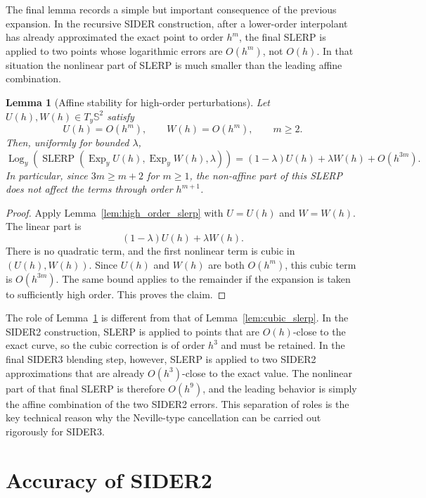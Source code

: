 \documentclass[a4paper,11pt]{article}
\newcommand{\bS}{\mathbb{S}}
\newcommand{\Log}{\operatorname{Log}}
\newcommand{\Exp}{\operatorname{Exp}}
\newcommand{\SLERP}{\operatorname{SLERP}}
\newtheorem{lemma}{Lemma}
\numberwithin{equation}{section}
\begin{document}
The final lemma records a simple but important consequence of the previous
expansion.  In the recursive SIDER construction, after a lower-order
interpolant has already approximated the exact point to order \(h^m\), the
final SLERP is applied to two points whose logarithmic errors are
\(O(h^m)\), not \(O(h)\).  In that situation the nonlinear part of SLERP is
much smaller than the leading affine combination.

\begin{lemma}[Affine stability for high-order perturbations]
\label{lem:affine_stability}
Let \(U(h),W(h)\in T_y\bS^2\) satisfy
\[
        U(h)=O(h^m),\qquad W(h)=O(h^m),
        \qquad m\geq2.
\]
Then, uniformly for bounded \(\lambda\),
\[
\Log_y\!\left(
\SLERP(\Exp_y U(h),\Exp_y W(h),\lambda)
\right)
=
(1-\lambda)U(h)+\lambda W(h)+O(h^{3m}).
\]
In particular, since \(3m\geq m+2\) for \(m\geq1\), the non-affine part of
this SLERP does not affect the terms through order \(h^{m+1}\).
\end{lemma}

\begin{proof}
Apply Lemma~\ref{lem:high_order_slerp} with \(U=U(h)\) and \(W=W(h)\).  The
linear part is
\[
        (1-\lambda)U(h)+\lambda W(h).
\]
There is no quadratic term, and the first nonlinear term is cubic in
\((U(h),W(h))\).  Since \(U(h)\) and \(W(h)\) are both \(O(h^m)\), this cubic
term is \(O(h^{3m})\).  The same bound applies to the remainder if the
expansion is taken to sufficiently high order.  This proves the claim.
\end{proof}

The role of Lemma~\ref{lem:affine_stability} is different from that of
Lemma~\ref{lem:cubic_slerp}.  In the SIDER2 construction, SLERP is applied to
points that are \(O(h)\)-close to the exact curve, so the cubic correction is
of order \(h^3\) and must be retained.  In the final SIDER3 blending step,
however, SLERP is applied to two SIDER2 approximations that are already
\(O(h^3)\)-close to the exact value.  The nonlinear part of that final SLERP
is therefore \(O(h^9)\), and the leading behavior is simply the affine
combination of the two SIDER2 errors.  This separation of roles is the key
technical reason why the Neville-type cancellation can be carried out
rigorously for SIDER3.

\section{Accuracy of SIDER2}
\end{document}
